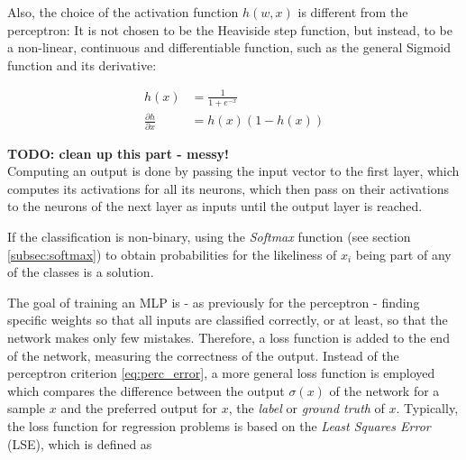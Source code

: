 \noindent Also, the choice of the activation function $h(w, x)$ is different from the perceptron: It is not chosen to be the Heaviside step function, but instead, to be a non-linear, continuous and differentiable function, such as the general Sigmoid function and its derivative:

\begin {align}
	 h(x) &= \frac{1}{1 + e^{-x}}\\
	\frac{\partial h}{\partial x} &= h(x)(1 - h(x))
\end {align}


\textbf{TODO: clean up this part - messy!}\\
\noindent Computing an output is done by passing the input vector to the first layer, which computes its activations for all its neurons, which then pass on their activations to the neurons of the next layer as inputs until the output layer is reached.

If the classification is non-binary, using the \textit{Softmax} function (see section \ref{subsec:softmax}) to obtain probabilities for the likeliness of $x_i$ being part of any of the classes is a solution.\\


\noindent The goal of training an MLP is - as previously for the perceptron - finding specific weights so that all inputs are classified correctly, or at least, so that the network makes only few mistakes. Therefore, a loss function is added to the end of the network, measuring the correctness of the output. Instead of the perceptron criterion \ref{eq:perc_error}, a more general loss function is employed which compares the difference between the output $\sigma(x)$ of the network for a sample $x$ and the preferred output for $x$, the \textit{label} or \textit{ground truth} of $x$. Typically, the loss function for regression problems is based on the \textit{Least Squares Error} (LSE), which is defined as

